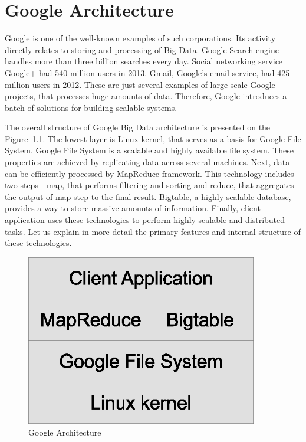 \chapter{Google Architecture}
\label{chap:google_architecture}

Google is one of the well-known examples of such corporations.
Its activity directly relates to storing and processing of Big Data.
Google Search engine handles more than three billion searches every day.
Social networking service Google+ had 540 million users in 2013.
Gmail, Google's email service, had 425 million users in 2012.
These are just several examples of large-scale Google projects, that processes huge amounts of data.
Therefore, Google introduces a batch of solutions for building scalable systems. 

The overall structure of Google Big Data architecture is presented on the
Figure~\ref{fig:google_architecture}.
The lowest layer is Linux kernel, that serves as a basis for Google File System.
Google File System is a scalable and highly available file system. 
These properties are achieved by replicating data across several machines.
Next, data can be efficiently processed by MapReduce framework.
This technology includes two steps - map, that performs filtering and sorting and reduce, that aggregates the output of map step to the final result.
Bigtable, a highly scalable database, provides a way to store massive amounts of information.
Finally, client application uses these technologies to perform highly scalable and distributed tasks.  
Let us explain in more detail the primary features and internal structure of these technologies.

\begin{figure}
  \centering
  \includegraphics [width=0.9\textwidth]{images/Google_architecture}
  \caption{Google Architecture}
  \label{fig:google_architecture}
\end{figure}

